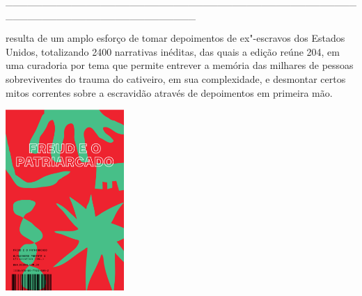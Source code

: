 \hspace*{-2cm}\_\_\_\_\_\_\_\_\_\_\_\_\_\_\_\_\_\_\_\_\_\_\_\_\_\_\_\_\_\_\_\_\_\_\_\_\_\_\_\_\_\_\_\_\_\_\_\_\_\_\_\_\_\_\_\_\_\_\_\_\_\_\_\_\_\_\_\_\_\_\_\_\_\_

\medskip

 resulta de um amplo esforço de tomar depoimentos de ex"-escravos dos Estados Unidos, totalizando 2400 narrativas inéditas, das quais a edição reúne 204, em uma curadoria por tema que permite entrever a memória das milhares de pessoas sobreviventes do trauma do cativeiro, em sua complexidade, e desmontar certos mitos correntes sobre a escravidão através de depoimentos em primeira mão.


\hspace{.5cm}

\hspace*{-.4cm}\begin{minipage}[c]{1\linewidth}
\small{
{}}
\end{minipage}

\pagebreak

\hspace{.5cm}

\begin{center}
\hspace*{-2.5cm}
\hspace{2cm}\includegraphics[width=45mm]{./imgs/freud.png}
\end{center}

